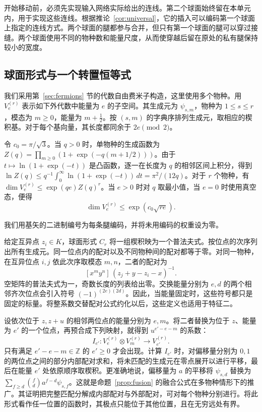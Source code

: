 开始移动前，必须先实现输入网络实际给出的连线。第二个球面始终留在本单元内，用于实现这些连线。根据推论~\ref{cor:universal}，它的插入可以编码第一个球面上指定的连线方式。两个球面的腿都参与合并，但只有第一个球面的腿可以穿过接缝。两个球面使用不同的物种数和能量尺度，从而使穿越后留在原处的私有腿保持较小的宽度。

\subsection{球面形式与一个转置恒等式}\label{subsec:seam}

我们采用第~\ref{sec:fermions} 节的代数自由费米子构造，这里使用多个物种。用 \(V^{(r)}_e\) 表示如下外代数中能量为 \(e\) 的子空间。其生成元为 \(\psi_{s,m}\)，物种为 \(1\le s\le r\)，模态为 \(m\ge0\)，能量为 \(m+\tfrac12\)。按 \((s,m)\) 的字典序排列生成元，取相应的楔积基。对于每个基向量，其长度都同余于 \(2e\pmod2\)。

令 \(c_0=\pi/\sqrt3\)。当 \(q>0\) 时，单物种的生成函数为 \(Z(q)=\prod_{m\ge0}(1+\exp(-q(m+1/2)))\)。由于 \(t\mapsto\ln(1+\exp(-t))\) 是凸函数，逐一在长度为 \(q\) 的相邻区间上积分，得到 \(\ln Z(q)\le q^{-1}\int_0^\infty\ln(1+\exp(-t))\,dt=\pi^2/(12q)\)。对于 \(r\) 个物种，有 \(\dim V^{(r)}_e\le\exp(qe)Z(q)^r\)。当 \(e>0\) 时对 \(q\) 取最小值，当 \(e=0\) 时使用真空态，便得
\begin{equation}\label{eq:local-width}
      \dim V^{(r)}_e\le \exp(c_0\sqrt{re}).
\end{equation}

我们用基矢的二进制编号为每条腿编码，并将未用编码的权重设为零。

给定互异点 \(z_i\in K\)，球面形式 \(C_r\) 将一组楔积映为一个普法夫式。按位点的次序列出所有生成元。同一位点内的配对以及不同物种间的配对都等于零。对同一物种，在互异位点 \(i,j\) 依此次序取模态 \(m,n\)，二者的配对为 \[
 [x^m y^n]\,(z_j+y-z_i-x)^{-1}.
\] 空矩阵的普法夫式为一，奇数长度的列表给出零。交换能量分别为 \(e,d\) 的两个相邻齐次位点会引入符号 \((-1)^{(2e)(2d)}\)。因此，当能量固定时，这些符号都只是固定的标量。将整系数交替配对公式约化以后，这些定义也适用于特征二。

设依次位于 \(z,z+u\) 的相邻两位点的能量分别为 \(e,m\)。将二者替换为位于 \(z\)、能量为 \(e'\) 的一个位点，再预合成下列映射，就得到 \(u^{e'-e-m}\) 的系数：\[
 I_{e'}:V^{(r)}_e\otimes V^{(r)}_m\longrightarrow V^{(r)}_{e'}.
\] 只有满足 \(e'-e-m\in\mathbb Z\) 的 \(e'\ge0\) 才会出现。计算 \(I_{e'}\) 时，对偏移量分别为 \(0,1\) 的两位点之间的部分内部配对求和，将未匹配的生成元在零点展开以进行平移，最后在能量 \(e'\) 处依原顺序取楔积。更准确地说，偏移量为 \(a\) 的平移将 \(\psi_{s,d}\) 替换为 \(\sum_{f\ge d}\binom fd a^{f-d}\psi_{s,f}\)。这就是命题~\ref{prop:fusion} 的融合公式在多物种情形下的推广。其证明把完整匹配分解成内部配对与外部配对，可对每个物种分别进行。将此形式看作任一位置的函数时，其极点只能位于其他位置，且在无穷远处有界。

